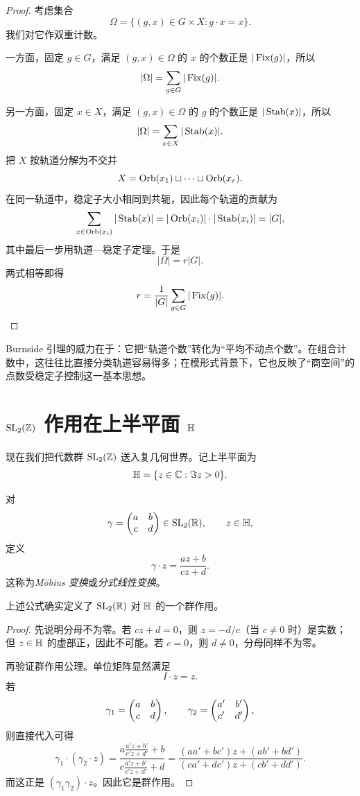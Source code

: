 \begin{proof}
考虑集合
\[
\Omega=\{(g,x)\in G\times X:g\cdot x=x\}.
\]
我们对它作双重计数。

一方面，固定 $g\in G$，满足 $(g,x)\in\Omega$ 的 $x$ 的个数正是 $|\operatorname{Fix}(g)|$，所以
\[
|\Omega|=\sum_{g\in G}|\operatorname{Fix}(g)|.
\]

另一方面，固定 $x\in X$，满足 $(g,x)\in\Omega$ 的 $g$ 的个数正是 $|\operatorname{Stab}(x)|$，所以
\[
|\Omega|=\sum_{x\in X}|\operatorname{Stab}(x)|.
\]
把 $X$ 按轨道分解为不交并
\[
X=\operatorname{Orb}(x_1)\sqcup\cdots\sqcup\operatorname{Orb}(x_r).
\]
在同一轨道中，稳定子大小相同到共轭，因此每个轨道的贡献为
\[
\sum_{x\in \operatorname{Orb}(x_i)}|\operatorname{Stab}(x)|=|\operatorname{Orb}(x_i)|\cdot |\operatorname{Stab}(x_i)|=|G|,
\]
其中最后一步用轨道—稳定子定理。于是
\[
|\Omega|=r|G|.
\]
两式相等即得
\[
r=\frac{1}{|G|}\sum_{g\in G}|\operatorname{Fix}(g)|.
\]
\end{proof}

\begin{remark}
Burnside 引理的威力在于：它把“轨道个数”转化为“平均不动点个数”。在组合计数中，这往往比直接分类轨道容易得多；在模形式背景下，它也反映了“商空间”的点数受稳定子控制这一基本思想。
\end{remark}

\section{$\mathrm{SL}_2(\mathbb{Z})$ 作用在上半平面 $\mathbb{H}$}

现在我们把代数群 $\mathrm{SL}_2(\mathbb{Z})$ 送入复几何世界。记上半平面为
\[
\mathbb{H}=\{z\in\mathbb{C}:\Im z>0\}.
\]

\begin{definition}
对
\[
\gamma=\begin{pmatrix} a&b\\ c&d \end{pmatrix}\in \mathrm{SL}_2(\mathbb{R}),
\qquad z\in \mathbb{H},
\]
定义
\[
\gamma\cdot z=\frac{az+b}{cz+d}.
\]
这称为\emph{Möbius 变换}或\emph{分式线性变换}。
\end{definition}

\begin{proposition}
上述公式确实定义了 $\mathrm{SL}_2(\mathbb{R})$ 对 $\mathbb{H}$ 的一个群作用。
\end{proposition}

\begin{proof}
先说明分母不为零。若 $cz+d=0$，则 $z=-d/c$（当 $c\ne 0$ 时）是实数；但 $z\in\mathbb{H}$ 的虚部正，因此不可能。若 $c=0$，则 $d\ne 0$，分母同样不为零。

再验证群作用公理。单位矩阵显然满足
\[
I\cdot z=z.
\]
若
\[
\gamma_1=\begin{pmatrix} a&b\\ c&d \end{pmatrix},
\qquad
\gamma_2=\begin{pmatrix} a'&b'\\ c'&d' \end{pmatrix},
\]
则直接代入可得
\[
\gamma_1\cdot(\gamma_2\cdot z)
=\frac{a\frac{a'z+b'}{c'z+d'}+b}{c\frac{a'z+b'}{c'z+d'}+d}
=\frac{(aa'+bc')z+(ab'+bd')}{(ca'+dc')z+(cb'+dd')}.
\]
而这正是 $(\gamma_1\gamma_2)\cdot z$。因此它是群作用。
\end{proof}

